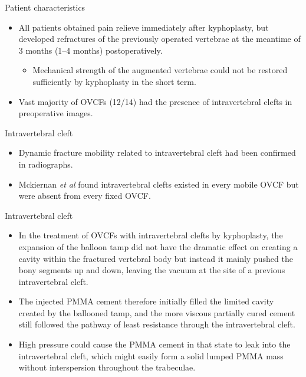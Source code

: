 \documentclass{beamer}
\begin{document}
\begin{frame}{Patient characteristics}
    \begin{itemize}
        \item All patients obtained pain relieve immediately after kyphoplasty,
              but developed refractures of the previously operated vertebrae at
              the meantime of 3 months (1--4 months) postoperatively.
            \begin{itemize}
                \item Mechanical strength of the augmented vertebrae could not
                      be restored sufficiently by kyphoplasty in the short term.
            \end{itemize}
        \item Vast majority of OVCFs (12/14) had the presence of intravertebral
              clefts in preoperative images.
    \end{itemize}
\end{frame}

\begin{frame}{Intravertebral cleft}
    \begin{itemize}
        \item Dynamic fracture mobility related to intravertebral cleft had
              been confirmed in radiographs.
        \item Mckiernan \textit{et al} found intravertebral clefts existed in
              every mobile OVCF but were absent from every fixed OVCF.
    \end{itemize}
\end{frame}

\begin{frame}{Intravertebral cleft}
    \begin{itemize}
        \item In the treatment of OVCFs with intravertebral clefts by
              kyphoplasty, the expansion of the balloon tamp did not have the
              dramatic effect on creating a cavity within the fractured
              vertebral body but instead it mainly pushed the bony segments up
              and down, leaving the vacuum at the site of a previous
              intravertebral cleft.
        \item The injected PMMA cement therefore initially filled the limited
              cavity created by the ballooned tamp, and the more viscous
              partially cured cement still followed the pathway of least
              resistance through the intravertebral cleft.
        \item High pressure could cause the PMMA cement in that state to leak
              into the intravertebral cleft, which might easily form a solid
              lumped PMMA mass without interspersion throughout the trabeculae.
    \end{itemize}
\end{frame}
\end{document}
